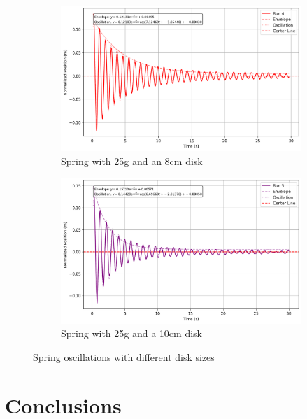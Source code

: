 \documentclass[12pt,letterpaper]{article}
\begin{document}
\begin{figure}[!htb]
\vspace{0.5cm}

\begin{subfigure}[b]{0.32\textwidth}
  \includegraphics[width=\linewidth]{images/8cm.png}
  \caption{Spring with 25g and an 8cm disk}\label{fig:8cm}
\end{subfigure}
\hfill
\begin{subfigure}[b]{0.32\textwidth}
  \includegraphics[width=\linewidth]{images/10cm.png}
  \caption{Spring with 25g and a 10cm disk}\label{fig:10cm}
\end{subfigure}
\caption{Spring oscillations with different disk sizes}
\label{fig:all_disks}
\end{figure}

\section{Conclusions}

\lipsum[1]


% 
% 
\end{document}
